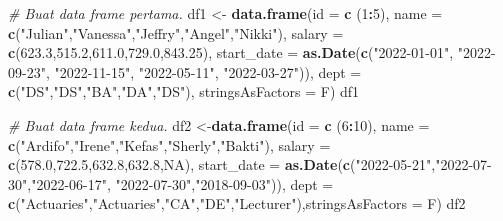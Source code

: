 \documentclass[
]{book}
\newenvironment{Shaded}{\begin{snugshade}}{\end{snugshade}}
\newcommand{\CommentTok}[1]{\textcolor[rgb]{0.56,0.35,0.01}{\textit{#1}}}
\newcommand{\DataTypeTok}[1]{\textcolor[rgb]{0.13,0.29,0.53}{#1}}
\newcommand{\DecValTok}[1]{\textcolor[rgb]{0.00,0.00,0.81}{#1}}
\newcommand{\FloatTok}[1]{\textcolor[rgb]{0.00,0.00,0.81}{#1}}
\newcommand{\KeywordTok}[1]{\textcolor[rgb]{0.13,0.29,0.53}{\textbf{#1}}}
\newcommand{\NormalTok}[1]{#1}
\newcommand{\OperatorTok}[1]{\textcolor[rgb]{0.81,0.36,0.00}{\textbf{#1}}}
\newcommand{\OtherTok}[1]{\textcolor[rgb]{0.56,0.35,0.01}{#1}}
\newcommand{\StringTok}[1]{\textcolor[rgb]{0.31,0.60,0.02}{#1}}
\begin{document}
\begin{Shaded}
\begin{Highlighting}[]
\CommentTok{# Buat data frame pertama.}
\NormalTok{df1 <-}\StringTok{ }\KeywordTok{data.frame}\NormalTok{(}\DataTypeTok{id =} \KeywordTok{c}\NormalTok{ (}\DecValTok{1}\OperatorTok{:}\DecValTok{5}\NormalTok{), }
                \DataTypeTok{name =} \KeywordTok{c}\NormalTok{(}\StringTok{"Julian"}\NormalTok{,}\StringTok{"Vanessa"}\NormalTok{,}\StringTok{"Jeffry"}\NormalTok{,}\StringTok{"Angel"}\NormalTok{,}\StringTok{"Nikki"}\NormalTok{),}
              \DataTypeTok{salary =} \KeywordTok{c}\NormalTok{(}\FloatTok{623.3}\NormalTok{,}\FloatTok{515.2}\NormalTok{,}\FloatTok{611.0}\NormalTok{,}\FloatTok{729.0}\NormalTok{,}\FloatTok{843.25}\NormalTok{), }
          \DataTypeTok{start_date =} \KeywordTok{as.Date}\NormalTok{(}\KeywordTok{c}\NormalTok{(}\StringTok{"2022-01-01"}\NormalTok{, }\StringTok{"2022-09-23"}\NormalTok{, }\StringTok{"2022-11-15"}\NormalTok{,                                               }\StringTok{"2022-05-11"}\NormalTok{, }\StringTok{"2022-03-27"}\NormalTok{)),}
                \DataTypeTok{dept =} \KeywordTok{c}\NormalTok{(}\StringTok{"DS"}\NormalTok{,}\StringTok{"DS"}\NormalTok{,}\StringTok{"BA"}\NormalTok{,}\StringTok{"DA"}\NormalTok{,}\StringTok{"DS"}\NormalTok{), }\DataTypeTok{stringsAsFactors =}\NormalTok{ F)}
\NormalTok{df1}
\end{Highlighting}
\end{Shaded}

\begin{Shaded}
\begin{Highlighting}[]
\CommentTok{# Buat data frame kedua.}
\NormalTok{df2 <-}\KeywordTok{data.frame}\NormalTok{(}\DataTypeTok{id =} \KeywordTok{c}\NormalTok{ (}\DecValTok{6}\OperatorTok{:}\DecValTok{10}\NormalTok{), }
               \DataTypeTok{name =} \KeywordTok{c}\NormalTok{(}\StringTok{"Ardifo"}\NormalTok{,}\StringTok{"Irene"}\NormalTok{,}\StringTok{"Kefas"}\NormalTok{,}\StringTok{"Sherly"}\NormalTok{,}\StringTok{"Bakti"}\NormalTok{),}
             \DataTypeTok{salary =} \KeywordTok{c}\NormalTok{(}\FloatTok{578.0}\NormalTok{,}\FloatTok{722.5}\NormalTok{,}\FloatTok{632.8}\NormalTok{,}\FloatTok{632.8}\NormalTok{,}\OtherTok{NA}\NormalTok{), }
         \DataTypeTok{start_date =} \KeywordTok{as.Date}\NormalTok{(}\KeywordTok{c}\NormalTok{(}\StringTok{"2022-05-21"}\NormalTok{,}\StringTok{"2022-07-30"}\NormalTok{,}\StringTok{"2022-06-17"}\NormalTok{,}
                                \StringTok{"2022-07-30"}\NormalTok{,}\StringTok{"2018-09-03"}\NormalTok{)),}
               \DataTypeTok{dept =} \KeywordTok{c}\NormalTok{(}\StringTok{"Actuaries"}\NormalTok{,}\StringTok{"Actuaries"}\NormalTok{,}\StringTok{"CA"}\NormalTok{,}\StringTok{"DE"}\NormalTok{,}\StringTok{"Lecturer"}\NormalTok{),}\DataTypeTok{stringsAsFactors =}\NormalTok{ F)}
\NormalTok{df2}
\end{Highlighting}
\end{Shaded}
\end{document}
